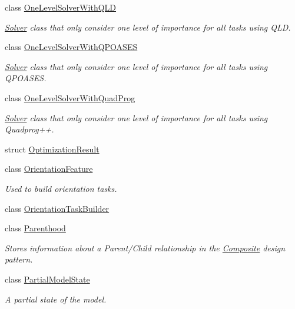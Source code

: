 \begin{DoxyCompactItemize}
class \hyperlink{classocra_1_1OneLevelSolverWithQLD}{One\+Level\+Solver\+With\+Q\+LD}
\begin{DoxyCompactList}\small\item\em \hyperlink{classocra_1_1Solver}{Solver} class that only consider one level of importance for all tasks using Q\+LD. \end{DoxyCompactList}\item 
class \hyperlink{classocra_1_1OneLevelSolverWithQPOASES}{One\+Level\+Solver\+With\+Q\+P\+O\+A\+S\+ES}
\begin{DoxyCompactList}\small\item\em \hyperlink{classocra_1_1Solver}{Solver} class that only consider one level of importance for all tasks using Q\+P\+O\+A\+S\+ES. \end{DoxyCompactList}\item 
class \hyperlink{classocra_1_1OneLevelSolverWithQuadProg}{One\+Level\+Solver\+With\+Quad\+Prog}
\begin{DoxyCompactList}\small\item\em \hyperlink{classocra_1_1Solver}{Solver} class that only consider one level of importance for all tasks using Quadprog++. \end{DoxyCompactList}\item 
struct \hyperlink{structocra_1_1OptimizationResult}{Optimization\+Result}
\item 
class \hyperlink{classocra_1_1OrientationFeature}{Orientation\+Feature}
\begin{DoxyCompactList}\small\item\em Used to build orientation tasks. \end{DoxyCompactList}\item 
class \hyperlink{classocra_1_1OrientationTaskBuilder}{Orientation\+Task\+Builder}
\item 
class \hyperlink{classocra_1_1Parenthood}{Parenthood}
\begin{DoxyCompactList}\small\item\em Stores information about a Parent/\+Child relationship in the \hyperlink{classocra_1_1Composite}{Composite} design pattern. \end{DoxyCompactList}\item 
class \hyperlink{classocra_1_1PartialModelState}{Partial\+Model\+State}
\begin{DoxyCompactList}\small\item\em A partial state of the model. \end{DoxyCompactList}\item 

\end{DoxyCompactItemize}
